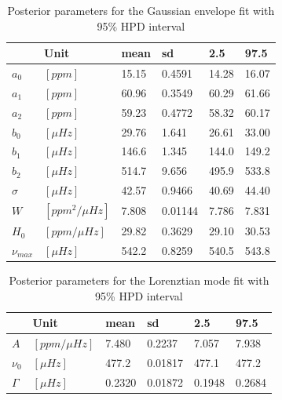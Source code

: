 \documentclass[
    aip,
    jmp,
    reprint,
    nofootinbib,
    floatfix
    ]{revtex4-1}
\begin{document}
    \begin{table}
        \centering
        \caption{Posterior parameters for the Gaussian envelope fit with 95\% HPD interval}
        \label{tab:envpost}
        \begin{tabular}{llllll}
            \hline
                       & Unit              & mean   & sd       & 2.5    & 97.5   \\ \hline\hline
            $a_0$      & $[ppm]$           & 15.15  & 0.4591   & 14.28  & 16.07  \\ 
            $a_1$      & $[ppm]$           & 60.96  & 0.3549   & 60.29  & 61.66  \\ 
            $a_2$      & $[ppm]$           & 59.23  & 0.4772   & 58.32  & 60.17  \\ 
            $b_0$      &  $[\mu Hz]$       & 29.76  & 1.641    & 26.61  & 33.00  \\ 
            $b_1$      & $[\mu Hz]$        & 146.6  & 1.345    & 144.0  & 149.2  \\ 
            $b_2$      & $[\mu Hz]$        & 514.7  & 9.656    & 495.9  & 533.8  \\ 
            $\sigma$   &  $[\mu Hz]$       & 42.57  & 0.9466   & 40.69  & 44.40  \\ 
            $W$        &  $[ppm^2/\mu Hz]$ & 7.808  & 0.01144  & 7.786  & 7.831  \\ 
            $H_0$      & $[ppm/\mu Hz]$    & 29.82  & 0.3629   & 29.10  & 30.53  \\ 
            $\nu_{max}$&$[\mu Hz]$         & 542.2  & 0.8259   & 540.5  & 543.8  \\ 
        \end{tabular}
    \end{table}
   
    \begin{table}
        \centering
        \caption{Posterior parameters for the Lorenztian mode fit with 95\% HPD interval}
        \label{tab:modepost}
        \begin{tabular}{llllll}
            \hline
                     & Unit           & mean   & sd      & 2.5    & 97.5   \\ \hline\hline
            $A$      & $[ppm/\mu Hz]$ & 7.480  & 0.2237  & 7.057  & 7.938  \\
            $\nu_0$  & $[\mu Hz]$     & 477.2  & 0.01817 & 477.1  & 477.2  \\
            $\Gamma$ & $[\mu Hz]$     & 0.2320 & 0.01872 & 0.1948 & 0.2684 \\
        \end{tabular}
    \end{table}
\end{document}
